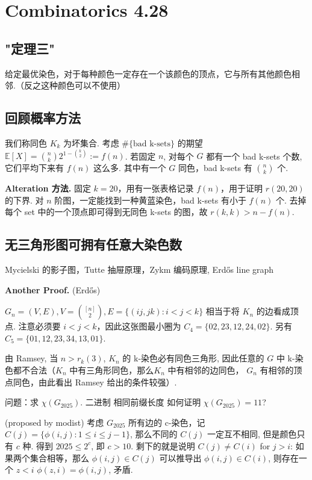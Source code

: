 \chapter{Combinatorics 4.28}
\label{ch:250428}

\section{"定理三"}

给定最优染色，对于每种颜色一定存在一个该颜色的顶点，它与所有其他颜色相邻.（反之这种颜色可以不使用）

\section{回顾概率方法}

我们称同色 $K_k$ 为坏集合. 考虑 $\# \text{\{bad k-sets\}}$ 的期望 $\mathbb{E}[X]={n\choose k}2^{1-{k\choose 2}}:=f(n)$. 若固定 $n$, 对每个 $G$ 都有一个 bad k-sets 个数, 它们平均下来有 $f(n)$ 这么多. 其中有一个 $G$ 同色，bad k-sets 有 ${n\choose k}$ 个.

\textbf{Alteration 方法.} 固定 $k=20$，用有一张表格记录 $f(n)$，用于证明 $r(20,20)$ 的下界. 对 $n$ 阶图，一定能找到一种黄蓝染色，bad k-sets 有小于 $f(n)$ 个. 去掉每个 set 中的一个顶点即可得到无同色 k-sets 的图，故 $r(k,k)>n-f(n)$.


\section{无三角形图可拥有任意大染色数}

Mycielski 的影子图，Tutte 抽屉原理，Zykm 编码原理, Erdős line graph


\textbf{Another Proof.} (Erdős)

$G_n=(V,E),V={[n]\choose 2},E=\{(ij,jk):i<j<k\}$ 相当于将 $K_n$ 的边看成顶点. 注意必须要 $i<j<k$，因此这张图最小圈为 $C_4=\{02,23,12,24,02\}$. 另有 $C_5=\{01,12,23,34,13,01\}$.

由 Ramsey, 当 $n>r_k(3)$, $K_n$ 的 k-染色必有同色三角形, 因此任意的 $G$ 中 k-染色都不合法（$K_n$ 中有三角形同色，那么$K_n$ 中有相邻的边同色， $G_n$ 有相邻的顶点同色，由此看出 Ramsey 给出的条件较强）.

问题：求 $\chi(G_{2025})$. 二进制 相同前缀长度 如何证明 $\chi(G_{2025})=11$?

(proposed by modist) 考虑 $G_{2025}$ 所有边的 c-染色，记 $C(j)=\{\phi(i,j):1\leq i\leq j-1\}$, 那么不同的 $C(j)$ 一定互不相同, 但是颜色只有 $c$ 种. 得到 $2025\leq 2^c$, 即 $c>10$. 剩下的就是说明 $C(j)\not=C(i)$ for $j>i$: 如果两个集合相等，那么 $\phi(i,j)\in C(j)$ 可以推导出 $\phi(i,j)\in C(i)$, 则存在一个 $z<i$ $\phi(z,i)=\phi(i,j)$, 矛盾.

